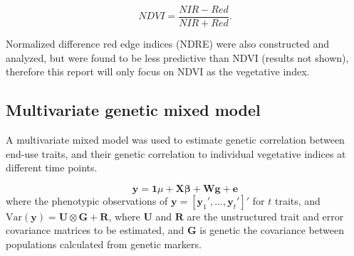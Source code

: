 \documentclass[12pt, letterpaper]{article}
\begin{document}
\begin{equation}
	NDVI = \frac{NIR - Red}{NIR + Red}.
\end{equation}

Normalized difference red edge indices (NDRE) were also constructed and analyzed, but were found to be less predictive than NDVI (results not shown), therefore this report will only focus on NDVI as the vegetative index. 


\subsection{Multivariate genetic mixed model}



A multivariate mixed model was used to estimate genetic correlation between end-use traits, and their genetic correlation to individual vegetative indices at different time points. 

\begin{equation} \label{mt}
	 \mathbf{y} = \mathbf{1} \mu + \mathbf{X} \boldsymbol{\beta} + \mathbf{W}\mathbf{g} + \mathbf{e} 
\end{equation}
\noindent where the phenotypic observations of $\mathbf{y} = [\mathbf{y}_1', \ldots, \mathbf{y}_t']'$ for $t$ traits, and $\text{Var}(\mathbf{y}) = \mathbf{U} \otimes \mathbf{G} + \mathbf{R}$, where $\mathbf{U}$ and $\mathbf{R}$ are the unstructured trait and error covariance matrices to be estimated, and $\mathbf{G}$ is genetic the covariance between populations calculated from genetic markers.
 
\end{document}

